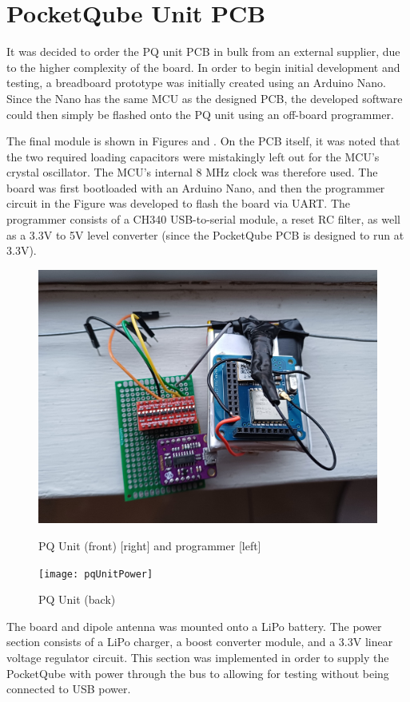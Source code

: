 \graphicspath{{./figures}}

\section{PocketQube Unit PCB}

It was decided to order the PQ unit PCB in bulk from an external supplier, due to the higher complexity of the board. In order to begin initial development and testing, a breadboard prototype was initially created using an Arduino Nano. Since the Nano has the same MCU as the designed PCB, the developed software could then simply be flashed onto the PQ unit using an off-board programmer.

The final module is shown in Figures and . On the PCB itself, it was noted that the two required loading capacitors were mistakingly left out for the MCU's crystal oscillator. The MCU's internal 8 MHz clock was therefore used. The board was first bootloaded with an Arduino Nano, and then the programmer circuit in the Figure was developed to flash the board via UART. The programmer consists of a CH340 USB-to-serial module, a reset RC filter, as well as a 3.3V to 5V level converter (since the PocketQube PCB is designed to run at 3.3V).

\begin{figure}[!htb]
  \begin{minipage}{.49\textwidth}
    \centering
    \includegraphics[width=0.85\linewidth]{pqUnitPCB}
    \caption{PQ Unit (front) [right] and programmer [left]}
    \label{fig:pqUnitPCB}
  \end{minipage}
  \begin{minipage}{.49\textwidth}
    \centering
    \texttt{[image: pqUnitPower]}
    \caption{PQ Unit (back)}
    \label{fig:pqUnitPower}
  \end{minipage}
\end{figure}

The board and dipole antenna was mounted onto a LiPo battery. The power section consists of a LiPo charger, a boost converter module, and a 3.3V linear voltage regulator circuit. This section was implemented in order to supply the PocketQube with power through the bus to allowing for testing without being connected to USB power.